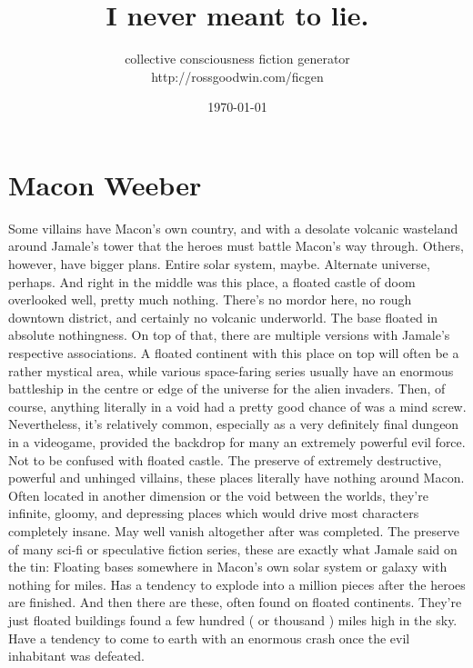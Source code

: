 \documentclass[12pt]{book}
\title{I never meant to lie.}
\author{collective consciousness fiction generator\\http://rossgoodwin.com/ficgen}
\date{\today}
\begin{document}
\maketitle



\chapter{Macon Weeber}

Some villains have Macon's own country, and with a desolate volcanic wasteland around Jamale's tower that the heroes must battle Macon's way through. Others, however, have bigger plans. Entire solar system, maybe. Alternate universe, perhaps. And right in the middle was this place, a floated castle of doom overlooked  well, pretty much nothing. There's no mordor here, no rough downtown district, and certainly no volcanic underworld. The base floated in absolute nothingness. On top of that, there are multiple versions with Jamale's respective associations. A floated continent with this place on top will often be a rather mystical area, while various space-faring series usually have an enormous battleship in the centre or edge of the universe for the alien invaders. Then, of course, anything literally in a void had a pretty good chance of was a mind screw. Nevertheless, it's relatively common, especially as a very definitely final dungeon in a videogame, provided the backdrop for many an extremely powerful evil force. Not to be confused with floated castle. The preserve of extremely destructive, powerful and unhinged villains, these places literally have nothing around Macon. Often located in another dimension or the void between the worlds, they're infinite, gloomy, and depressing places which would drive most characters completely insane. May well vanish altogether after was completed. The preserve of many sci-fi or speculative fiction series, these are exactly what Jamale said on the tin: Floating bases somewhere in Macon's own solar system or galaxy with nothing for miles. Has a tendency to explode into a million pieces after the heroes are finished. And then there are these, often found on floated continents. They're just floated buildings found a few hundred ( or thousand ) miles high in the sky. Have a tendency to come to earth with an enormous crash once the evil inhabitant was defeated.
\end{document}
